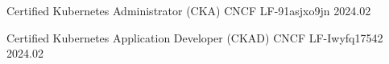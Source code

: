 

\begin{cvhonors}

  \cvhonor
    {Certified Kubernetes Administrator (CKA)} %
    {CNCF} %
    {LF-91asjxo9jn} %
    {2024.02} %

  \cvhonor
    {Certified Kubernetes Application Developer (CKAD)} %
    {CNCF} %
    {LF-Iwyfq17542} %
    {2024.02} %

\end{cvhonors}
